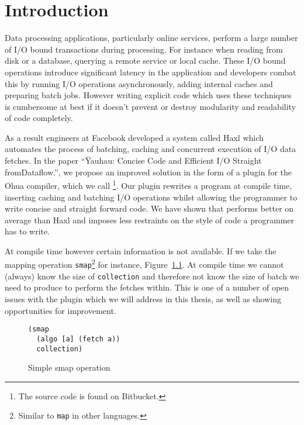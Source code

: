 \chapter{Introduction}

\label{ch:Intro}

Data processing applications, particularly online services, perform a large number of I/O bound transactions during processing.
For instance when reading from disk or a database, querying a remote service or local cache.
These I/O bound operations introduce significant latency in the application and developers combat this by running I/O operations asynchronously, adding internal caches and preparing batch jobs.
However writing explicit code which uses these techniques is cumbersome at best if it doesn't prevent or destroy modularity and readability of code completely.

As a result engineers at Facebook developed a system called Haxl\cite{Marlow:2014:NFA:2692915.2628144} which automates the process of batching, caching and concurrent execution of I/O data fetches.
In the paper ``Ÿauhau: Concise Code and Efficient I/O Straight from\-Dataflow.''\cite{ErtelGoensAdamEtAl2016}, we propose an improved solution in the form of a plugin for the Ohua\cite{Ertel:2015:OID:2807426.2807431}\cite{Ohua:library:link} compiler, which we call \yauhau{}\footnote{The source code is found on Bitbucket\cite{Yauhau:repository:link}.}.
Our plugin rewrites a program at compile time, inserting caching and batching I/O operations whilst allowing the programmer to write concise and straight forward code.
We have shown that \yauhau{} performs better on average than Haxl and imposes less restraints on the style of code a programmer has to write.

At compile time however certain information is not available.
If we take the mapping operation \texttt{smap}\footnote{Similar to \texttt{map} in other languages.} for instance, Figure~\ref{fig:simple-smap-operation}.
At compile time we cannot (always) know the size of \texttt{collection} and therefore not know the size of batch we need to produce to perform the fetches within.
This is one of a number of open issues with the \yauhau{} plugin which we will address in this thesis, as well as showing opportunities for improvement.

\begin{figure}[h]
\begin{verbatim}
(smap
  (algo [a] (fetch a))
  collection)
\end{verbatim}
\caption{Simple smap operation}
\label{fig:simple-smap-operation}
\end{figure}

